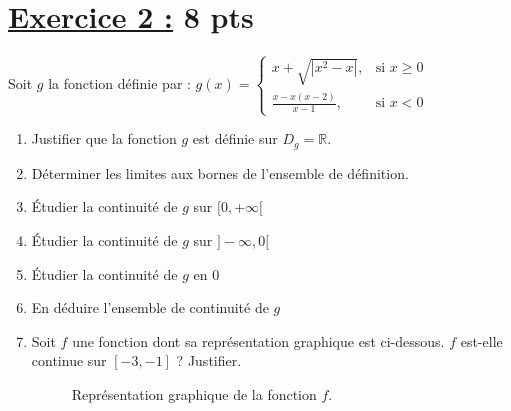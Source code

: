 \documentclass[12pt,a4paper]{article}
\begin{document}
\section*{\underline{Exercice 2 :} 8 pts }
Soit \( g \) la fonction définie par :
\(
g(x) =
\begin{cases}
    x + \sqrt{|x^2 - x|},     & \text{si } x \geq 0 \\
    \frac{x - x(x-2)}{x - 1}, & \text{si } x < 0
\end{cases}
\)

\begin{enumerate}
    \item Justifier que la fonction \( g \) est définie sur \( D_g = \mathbb{R} \).
    \item Déterminer les limites aux bornes de l'ensemble de définition.
    \item Étudier la continuité de \( g \) sur \( [0, +\infty[ \)
    \item Étudier la continuité de \( g \) sur \( ]-\infty, 0[ \)
    \item Étudier la continuité de \( g \) en \( 0 \)
    \item En déduire l'ensemble de continuité de \( g \)
    \item Soit \( f \) une fonction dont sa représentation graphique est ci-dessous. \( f \) est-elle continue sur \( [-3, -1] \) ? Justifier.
          \begin{center}
              \begin{figure}[H]
                  \caption{Représentation graphique de la fonction \( f \).}
                  \label{fig:fonction_f}
              \end{figure}
          \end{center}
\end{enumerate}
\end{document}
